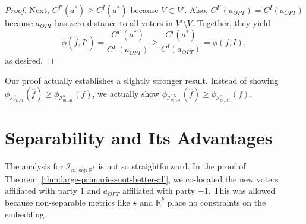 \documentclass[letterpaper]{article} %
\theoremstyle{definition}
\renewcommand{\hat}{\widehat}
\newcommand{\bbR}{\mathbb{R}}
\newcommand{\calI}{\mathcal{I}}
\newcommand{\calM}{\mathcal{M}}
\newcommand{\pleft}{-1}
\newcommand{\pright}{1}
\newcommand{\all}{\star}
\newcommand{\sep}{\textrm{sep-}}
\newcommand{\euc}[1]{\bbR^{#1}}
\newcommand{\eucsep}[1]{\sep\euc{#1}}
\newcommand{\I}{\calI}
\begin{document}
\begin{proof}
	Next, $C^{I'}(a^*) \ge C^I(a^*)$ because $V \subset V'$. Also, $C^{I'}(a_{OPT}) = C^I(a_{OPT})$ because $a_{OPT}$ has zero distance to all voters in $V' \setminus V$. Together, they yield
	\begin{equation}
	\phi(\hat{f},I') = \frac{C^{I'}(a^*)}{C^{I'}(a_{OPT})} \ge \frac{C^I(a^*)}{C^I(a_{OPT})} = \phi(f,I),
	\label{eqn:translate-worst-case}
	\end{equation}
	as desired.
%
%
\end{proof}

Our proof actually establishes a slightly stronger result. Instead of showing $\phi_{\I^{\alpha}_{m,\calM}}(\hat{f}) \ge \phi_{\I^{\alpha}_{m,\calM}}(f)$, we actually show $\phi_{\I^{0.5}_{m,\calM}}(\hat{f}) \ge \phi_{\I^{\alpha}_{m,\calM}}(f)$.

\section{Separability and Its Advantages}
\label{sec:large-primaries-better-line}

The analysis for $\I_{m,\eucsep{k}}$ is not so straightforward. In the proof of Theorem~\ref{thm:large-primaries-not-better-all}, we co-located the new voters affiliated with party $\pright$ and $a_{OPT}$ affiliated with party $\pleft$. This was allowed because non-separable metrics like $\all$ and $\euc{k}$ place no constraints on the embedding.
\end{document}
